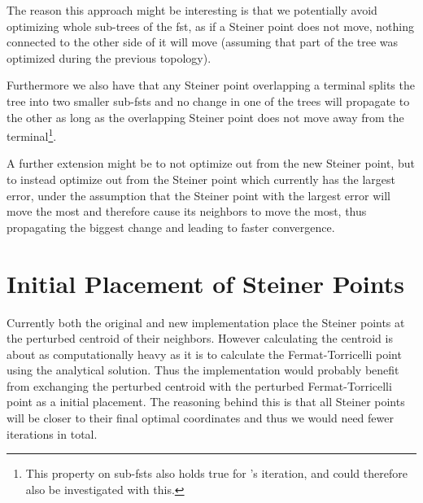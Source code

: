 The reason this approach might be interesting is that we potentially avoid
optimizing whole sub-trees of the \ac{fst}, as if a Steiner point does not move,
nothing connected to the other side of it will move (assuming that part of the
tree was optimized during the previous topology).

Furthermore we also have that any Steiner point overlapping a terminal splits
the tree into two smaller sub-\acp{fst} and no change in one of the trees will
propagate to the other as long as the overlapping Steiner point does not move
away from the terminal\footnote{This property on sub-\acp{fst} also holds true for
\citeauthor{smith1992}'s iteration, and could therefore also be investigated
with this.}.

A further extension might be to not optimize out from the new Steiner point, but
to instead optimize out from the Steiner point which currently has the largest
error, under the assumption that the Steiner point with the largest error will
move the most and therefore cause its neighbors to move the most, thus
propagating the biggest change and leading to faster convergence.

\section{Initial Placement of Steiner Points}
\label{sec:init-plac-stein}

Currently both the original and new implementation place the Steiner points at the
perturbed centroid of their neighbors. However calculating the centroid is
about as computationally heavy as it is to calculate the Fermat-Torricelli point
using the analytical solution. Thus the implementation would probably benefit
from exchanging the perturbed centroid with the perturbed Fermat-Torricelli
point as a initial placement. The reasoning behind this is that all Steiner
points will be closer to their final optimal coordinates and thus we would need
fewer iterations in total.

